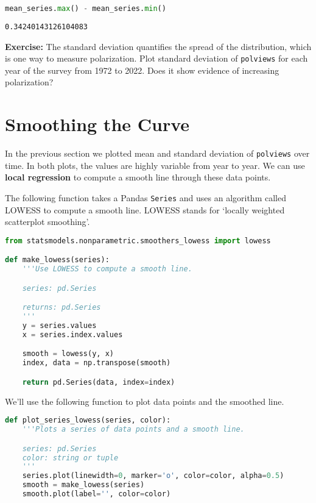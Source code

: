 \begin{lstlisting}[language=Python,style=source]
mean_series.max() - mean_series.min()
\end{lstlisting}

\begin{lstlisting}[style=output]
0.34240143126104083
\end{lstlisting}

\textbf{Exercise:} The standard deviation quantifies the spread of the
distribution, which is one way to measure polarization. Plot standard
deviation of \passthrough{\lstinline!polviews!} for each year of the
survey from 1972 to 2022. Does it show evidence of increasing
polarization?

\section{Smoothing the Curve}\label{smoothing-the-curve}

In the previous section we plotted mean and standard deviation of
\passthrough{\lstinline!polviews!} over time. In both plots, the values
are highly variable from year to year. We can use \textbf{local
regression} to compute a smooth line through these data points.

The following function takes a Pandas \passthrough{\lstinline!Series!}
and uses an algorithm called LOWESS to compute a smooth line. LOWESS
stands for `locally weighted scatterplot smoothing'.

\begin{lstlisting}[language=Python,style=source]
from statsmodels.nonparametric.smoothers_lowess import lowess

def make_lowess(series):
    '''Use LOWESS to compute a smooth line.

    series: pd.Series

    returns: pd.Series
    '''
    y = series.values
    x = series.index.values

    smooth = lowess(y, x)
    index, data = np.transpose(smooth)

    return pd.Series(data, index=index)
\end{lstlisting}

We'll use the following function to plot data points and the smoothed
line.

\begin{lstlisting}[language=Python,style=source]
def plot_series_lowess(series, color):
    '''Plots a series of data points and a smooth line.

    series: pd.Series
    color: string or tuple
    '''
    series.plot(linewidth=0, marker='o', color=color, alpha=0.5)
    smooth = make_lowess(series)
    smooth.plot(label='', color=color)
\end{lstlisting}

